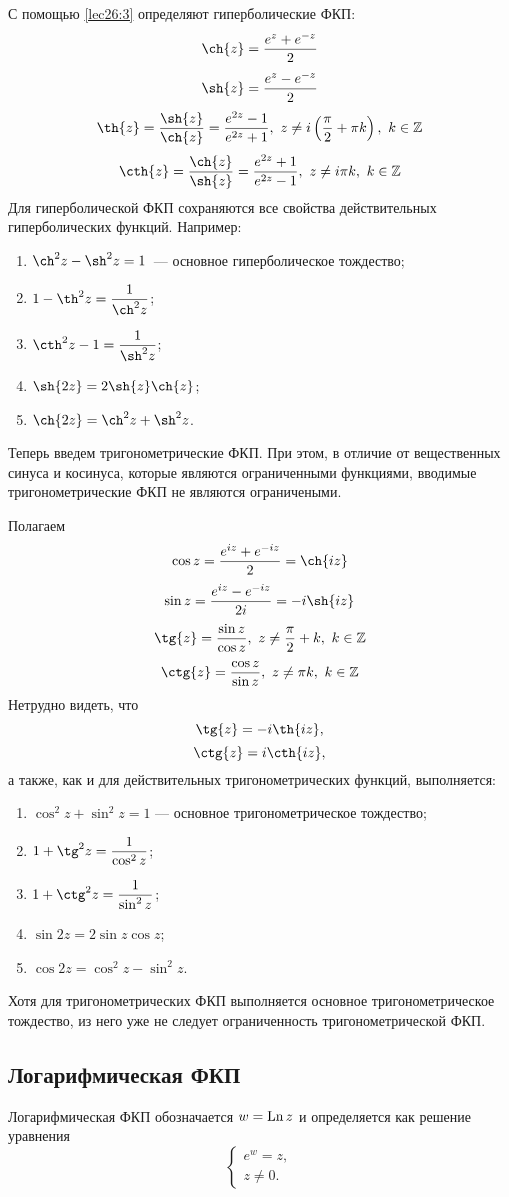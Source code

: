 \documentclass[../../main.tex]{subfiles}
\begin{document}
С помощью \eqref{lec26:3} определяют гиперболические ФКП:
\[
 \ch{z} = \frac{e^z + e^{-z}}{2}
\]
\[
 \sh{z} = \frac{e^z - e^{-z}}{2}
\]
\[
 \th{z} = \frac{\sh{z}}{\ch{z}} = \frac{e^{2z} - 1}{e^{2z} + 1},\ 
 z \neq i\left(\frac{\pi}{2} + \pi k\right),\ k \in \Z
\]
\[
 \cth{z} = \frac{\ch{z}}{\sh{z}} =
 \frac{e^{2z} + 1}{e^{2z} - 1},\ z \neq i \pi k,\ k \in \Z
\]
Для гиперболической ФКП сохраняются все свойства действительных 
гиперболических функций.
Например:
\begin{enumerate}
 \item $\ch^{2}{z} - \sh^{2}{z} = 1$~--- основное гиперболическое тождество;
 \item $1 - \th^{2}{z} = \dfrac{1}{\ch^{2}{z}}$;
 \item $\cth^{2}{z} - 1= \dfrac{1}{\sh^{2}{z}}$;
 \item $\sh{2z} = 2\sh{z} \ch{z}$;
 \item $\ch{2z} = \ch^{2}{z} + \sh^{2}{z}$.
\end{enumerate}

Теперь введем тригонометрические ФКП.
При этом, в отличие от вещественных синуса и косинуса, которые являются 
ограниченными функциями, вводимые тригонометрические ФКП не являются 
ограничеными.

Полагаем
\[\cos{z} = \frac{e^{iz} + e^{-iz}}{2} = \ch{iz}\]
\[
 \sin{z} = \frac{e^{iz} - e^{-iz}}{2i} = -i \sh{iz}
\]
\[
 \tg{z} = \frac{\sin{z}}{\cos{z}},\ z \neq \frac{\pi}{2} + k,\ k \in \Z
\]
\[
 \ctg{z} = \frac{\cos{z}}{\sin{z}},\ z \neq \pi k,\ k \in \Z
\]
Нетрудно видеть, что
\[\tg{z} = -i\th{iz},\]
\[\ctg{z} = i\cth{iz},\]
а также, как и для действительных тригонометрических функций, выполняется:
\begin{enumerate}
\item $\cos^2{z} + \sin^2{z} = 1\text{~--- основное тригонометрическое 
тождество}$;
\item $1 + \tg^{2}{z} = \dfrac{1}{\cos^2{z}}$;
\item $1 + \ctg^{2}{z} = \dfrac{1}{\sin^2{z}}$;
\item $\sin{2z} = 2 \sin{z} \cos{z}$;
\item $\cos{2z} = \cos^{2}{z} -  \sin^{2}{z}$.
\end{enumerate}

Хотя для тригонометрических ФКП выполняется основное тригонометрическое
тождество, из него уже не следует ограниченность 
тригонометрической ФКП.

\subsection{Логарифмическая ФКП}
Логарифмическая ФКП обозначается $w = \operatorname{Ln}{z}$ 
и определяется как решение уравнения 
\begin{equation}
 \label{lec26;4}
 \begin{cases}
   e^{w} = z, \\
   z \neq 0.
 \end{cases}
\end{equation}
\end{document}
